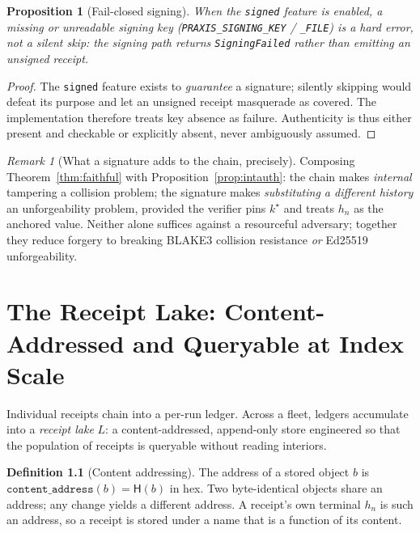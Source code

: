 \documentclass[11pt,oneside]{book}
\theoremstyle{definition}
\newtheorem{definition}{Definition}[chapter]
\theoremstyle{plain}
\newtheorem{proposition}[theorem]{Proposition}
\theoremstyle{remark}
\newtheorem*{remark}{Remark}
\newcommand{\chainH}{\mathsf{H}}               %
\newcommand{\code}[1]{\texttt{#1}}
\newcommand{\Lake}{L}                 %
\begin{document}
\begin{proposition}[Fail-closed signing]\label{prop:failclosed}
When the \code{signed} feature is enabled, a missing or unreadable signing key
(\code{PRAXIS\_SIGNING\_KEY} / \code{\_FILE}) is a hard error, not a silent skip: the signing
path returns \code{SigningFailed} rather than emitting an unsigned receipt. %
\end{proposition}

\begin{proof}
The \code{signed} feature exists to \emph{guarantee} a signature; silently skipping would
defeat its purpose and let an unsigned receipt masquerade as covered. %
The implementation
therefore treats key absence as failure. %
Authenticity is thus either present and checkable or
explicitly absent, never ambiguously assumed. %
 \end{proof}

\begin{remark}[What a signature adds to the chain, precisely]
Composing Theorem~\ref{thm:faithful} with Proposition~\ref{prop:intauth}: the chain makes
\emph{internal} tampering a collision problem; the signature makes \emph{substituting a
different history} an unforgeability problem, provided the verifier pins $k^{\star}$ and treats
$h_n$ as the anchored value. %
Neither alone suffices against a resourceful adversary; together
they reduce forgery to breaking BLAKE3 collision resistance \emph{or} Ed25519 unforgeability. %
\end{remark}

\chapter{The Receipt Lake: Content-Addressed and Queryable at Index Scale}
\label{ch:lake}

Individual receipts chain into a per-run ledger. %
Across a fleet, ledgers accumulate into a
\emph{receipt lake} $\Lake$: a content-addressed, append-only store engineered so that the
population of receipts is queryable without reading interiors. %

\begin{definition}[Content addressing]\label{def:contentaddr}
The address of a stored object $b$ is $\code{content\_address}(b)=\chainH(b)$ in hex. %
Two
byte-identical objects share an address; any change yields a different address. %
A receipt's
own terminal $h_n$ is such an address, so a receipt is stored under a name that is a function
of its content. %
\end{definition}
\end{document}
